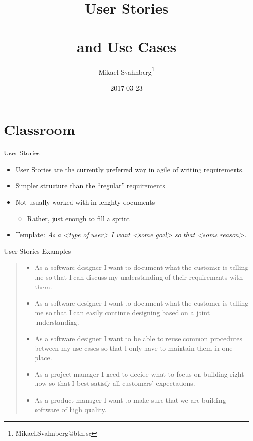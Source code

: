 \documentclass[10pt,t,a4paper]{beamer}
\author{Mikael Svahnberg\thanks{Mikael.Svahnberg@bth.se}}
\date{2017-03-23}
\title{User Stories \\\\ and Use Cases}
\begin{document}
\maketitle

\section{Classroom}
\label{sec-1}
\begin{frame}[label=sec-1-1]{User Stories}
\begin{itemize}
\item User Stories are the currently preferred way in agile of writing requirements.
\item Simpler structure than the ``regular'' requirements
\item Not usually worked with in lenghty documents
\begin{itemize}
\item Rather, just enough to fill a sprint
\end{itemize}
\item Template: \emph{As a <type of user> I want <some goal> so that <some reason>.}
\end{itemize}
\end{frame}
\begin{frame}[label=sec-1-2]{User Stories Examples}
\begin{quote}
\begin{itemize}
\item As a software designer I want to document what the customer is telling me so that I can discuss my understanding of their requirements with them.
\item As a software designer I want to document what the customer is telling me so that I can easily continue designing based on a joint understanding.
\item As a software designer I want to be able to reuse common procedures between my use cases so that I only have to maintain them in one place.
\item As a project manager I need to decide what to focus on building right now so that I best satisfy all customers' expectations.
\item As a product manager I want to make sure that we are building software of high quality.
\end{itemize}
\end{quote}
\end{frame}
\end{document}
